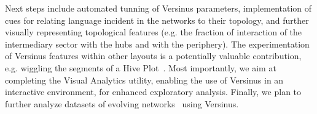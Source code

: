 \documentclass[runningheads]{llncs}
\begin{document}
Next steps include
automated tunning of Versinus parameters, 
implementation of cues for relating language incident in the networks to their topology, and
further visually representing topological features (e.g. the fraction of interaction of the intermediary sector with the hubs and with the periphery).
The experimentation of Versinus features within other layouts is a potentially
valuable contribution, e.g. wiggling the segments of a Hive Plot~\cite{hive}.
Most importantly, we aim at completing the Visual Analytics utility,
enabling the use of Versinus in an interactive environment, for enhanced exploratory analysis.
Finally, we plan to further analyze datasets of evolving networks~\cite{stab} using Versinus.


%
%
%


%
% 
% 
% 
% 
\end{document}
